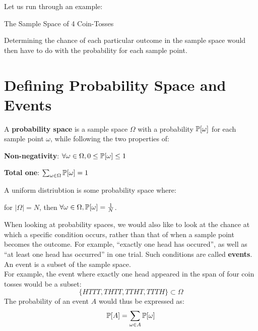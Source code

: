 Let us run through an example:
\begin{ln-fig}{The Sample Space of 4 Coin-Tosses}{}
    \begin{center}
    \end{center}
\end{ln-fig}
Determining the chance of each particular outcome in the sample space would then have to do with the probability for each sample point.

\section{Defining Probability Space and Events}
A \textbf{probability space} is a sample space $\Omega$ with a probability $\P[\omega]$ for each sample point $\omega$, while following the two properties of:
\begin{bindenum}
    \item \textbf{Non-negativity}: $\forall \omega \in \Omega, 0 \leq \P[\omega] \leq 1$
    \item \textbf{Total one}: $\sum_{\omega \in \Omega} \P[\omega] = 1$
\end{bindenum}
A uniform distriubtion is some probability space where:
\begin{center}
    for $|\Omega| = N$, then $\forall \omega \in \Omega, \P[\omega] = \frac{1}{N}$.
\end{center}

When looking at probability spaces, we would also like to look at the chance at which a specific condition occurs, rather than that of when a sample point becomes the outcome. For example, ``exactly one head has occured'', as well as ``at least one head has occurred'' in one trial. Such conditions are called \textbf{events}. \\
An event is a subset of the sample space. \\
For example, the event where exactly one head appeared in the span of four coin tosses would be a subset:
\[\{HTTT, THTT, TTHT, TTTH\} \subset \Omega\]
The probability of an event $A$ would thus be expressed as:
\[\P[A] = \sum_{\omega \in A} \P[\omega]\]

